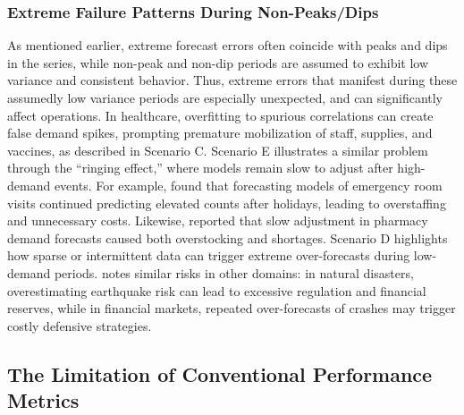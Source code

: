 \documentclass[12pt]{article}
\begin{document}

\subsubsection{Extreme Failure Patterns During Non-Peaks/Dips}

As mentioned earlier, extreme forecast errors often coincide with peaks and dips in the series, while non-peak and non-dip periods are assumed to exhibit low variance and consistent behavior. Thus, extreme errors that manifest during these assumedly low variance periods are especially unexpected, and can significantly affect operations. In healthcare, overfitting to spurious correlations can create false demand spikes, prompting premature mobilization of staff, supplies, and vaccines, as described in Scenario C. Scenario E illustrates a similar problem through the “ringing effect,” where models remain slow to adjust after high-demand events. For example, \citet{Burkom2007} found that forecasting models of emergency room visits continued predicting elevated counts after holidays, leading to overstaffing and unnecessary costs. Likewise, \citet{lopez2014} reported that slow adjustment in pharmacy demand forecasts caused both overstocking and shortages. Scenario D highlights how sparse or intermittent data can trigger extreme over-forecasts during low-demand periods. \citet{nikolopoulos2021} notes similar risks in other domains: in natural disasters, overestimating earthquake risk can lead to excessive regulation and financial reserves, while in financial markets, repeated over-forecasts of crashes may trigger costly defensive strategies.

\subsection{The Limitation of Conventional Performance Metrics}
\end{document}
